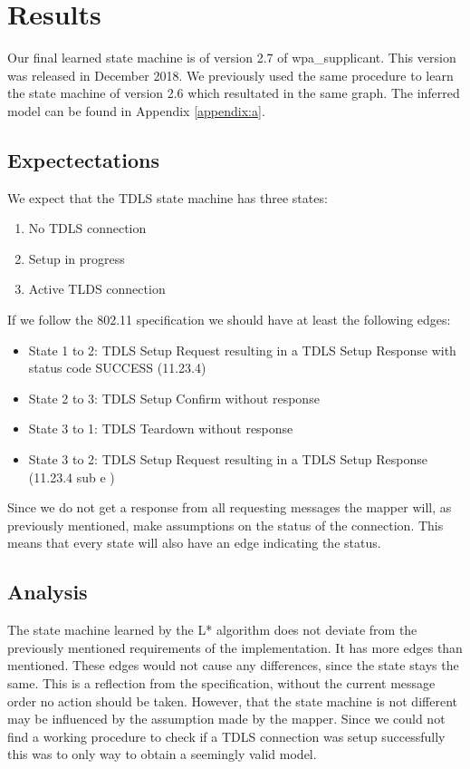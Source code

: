 \chapter{Results}

Our final learned state machine is of version 2.7 of wpa\_supplicant. This version was released in December 2018. We previously used the same procedure to learn the state machine of version 2.6 which resultated in the same graph. The inferred model can be found in Appendix \ref{appendix:a}.

\section{Expectectations}

We expect that the TDLS state machine has three states:
\begin{enumerate}
	\item No TDLS connection
	\item Setup in progress
	\item Active TLDS connection
\end{enumerate}

If we follow the 802.11 specification we should have at least the following edges:
\begin{itemize}
	\item State 1 to 2: TDLS Setup Request resulting in a TDLS Setup Response with status code SUCCESS (11.23.4)
	\item State 2 to 3: TDLS Setup Confirm without response
	\item State 3 to 1: TDLS Teardown without response
	\item State 3 to 2: TDLS Setup Request resulting in a TDLS Setup Response (11.23.4 sub e \cite{80211})
\end{itemize}

Since we do not get a response from all requesting messages the mapper will, as previously mentioned, make assumptions on the status of the connection. This means that every state will also have an edge indicating the status.

\section{Analysis}

The state machine learned by the L* algorithm does not deviate from the previously mentioned requirements of the implementation. It has more edges than mentioned. These edges would not cause any differences, since the state stays the same. This is a reflection from the specification, without the current message order no action should be taken. However, that the state machine is not different may be influenced by the assumption made by the mapper. Since we could not find a working procedure to check if a TDLS connection was setup successfully this was to only way to obtain a seemingly valid model.

